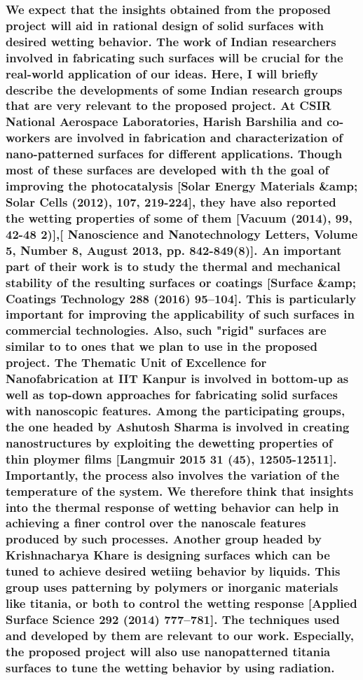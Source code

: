 \documentclass[a4paper,12pt,single,pdftex]{scrartcl}
\begin{document}
{\label{ID_1523203023}\subsubsection{We expect that the insights obtained from the proposed project will aid in rational design of solid surfaces with desired wetting behavior. The work of Indian researchers involved in fabricating such surfaces will be crucial for the real-world application of our ideas. Here, I will briefly describe the developments of some Indian research groups that are very relevant to the proposed project. At CSIR National Aerospace Laboratories, Harish Barshilia and co-workers are involved in fabrication and characterization of nano-patterned surfaces for different applications. Though most of these surfaces are developed with th the goal of improving the photocatalysis [Solar Energy Materials &amp; Solar Cells (2012), 107, 219-224], they have also reported the wetting properties of some of them [Vacuum (2014), 99, 42-48 2)],[ Nanoscience and Nanotechnology Letters, Volume 5, Number 8, August 2013, pp. 842-849(8)]. An important part of their work is to study the thermal and mechanical stability of the resulting surfaces or coatings [Surface &amp; Coatings Technology 288 (2016) 95–104]. This is particularly important for improving the applicability of such surfaces in commercial technologies. Also, such "rigid" surfaces are similar to to ones that we plan to use in the proposed project. The Thematic Unit of Excellence for Nanofabrication at IIT Kanpur is involved in bottom-up as well as top-down approaches for fabricating solid surfaces with nanoscopic features. Among the participating groups, the one headed by Ashutosh Sharma is involved in creating nanostructures by exploiting the dewetting properties of thin ploymer films [Langmuir 2015 31 (45), 12505-12511]. Importantly, the process also involves the variation of the temperature of the system. We therefore think that insights into the thermal response of wetting behavior can help in achieving a finer control over the nanoscale features produced by such processes. Another group headed by Krishnacharya Khare is designing surfaces which can be tuned to achieve desired wetiing behavior by liquids. This group uses patterning by polymers or inorganic materials like titania, or both to control the wetting response [Applied Surface Science 292 (2014) 777–781]. The techniques used and developed by them are relevant to our work. Especially, the proposed project will also use nanopatterned titania surfaces to tune the wetting behavior by using radiation.}

}
\end{document}
